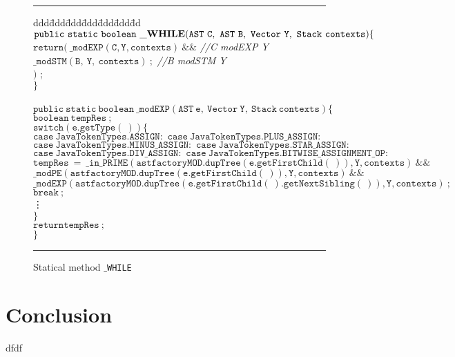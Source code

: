 \documentclass[a4paper]{llncs}
\begin{document}
\begin{figure}[hbt]
\rule{\linewidth}{0.25mm}
\begin{tabbing}
ddd\=ddd\=ddd\=ddd\=ddd\=ddd\=dd \kill
$\mathtt{public\ static\ boolean\ \_{\bf WHILE}(AST\ C,\ AST\ B,\ Vector\ Y,\ Stack\ contexts)\{}$
\\
\>$\mathtt{return(\ \_modEXP(C,Y,contexts)\ \&\&}$ {\it //C modEXP Y} \\
\>\>\>$\mathtt{\_modSTM(B,\ Y,\ contexts)\ ;}$ {\it //B modSTM Y} \\
\>\>$\mathtt{)}$ ; \\
$\mathtt{\}}$ 
\\
\\
$\mathtt{public\ static\ boolean\ \_modEXP(AST\ e,\ Vector\ Y,\ Stack\ contexts)\{}$ \\
\>$\mathtt{boolean\ tempRes\ ;}$ \\
\>$\mathtt{switch(e.getType(\ ))\{}$ \\
\>\>$\mathtt{case\ JavaTokenTypes.ASSIGN:\,\, case\ JavaTokenTypes.PLUS\_ASSIGN:}$  \\
\>\>$\mathtt{case\ JavaTokenTypes.MINUS\_ASSIGN:\,\,case\ JavaTokenTypes.STAR\_ASSIGN:}$ \\
\>\>$\mathtt{case\ JavaTokenTypes.DIV\_ASSIGN:\,\,case\ JavaTokenTypes.BITWISE\_ASSIGNMENT\_OP:}$ \\
\>\>$\mathtt{tempRes\ =\ \_in\_PRIME(astfactoryMOD.dupTree(e.getFirstChild(\ )),Y,contexts)\ \&\&}$  \\ %
\>\>\>$\mathtt{\_modPE(astfactoryMOD.dupTree(e.getFirstChild(\ )),Y,contexts)\ \&\&}$  \\ %
\>\>\>$\mathtt{\_modEXP(astfactoryMOD.dupTree(e.getFirstChild(\ ).getNextSibling(\ )),Y,contexts)\ ;}$ \\%
\>\>$\mathtt{break\ ;}$ \\
\>\>\vdots \\
\>$\mathtt{\}}$ \\
\>$\mathtt{return tempRes\ ;} $ \\
$\mathtt{\}}$
\end{tabbing}
\caption{Statical method \texttt{$\_$WHILE}}
\label{fig-met-sta-whi}
\rule{\linewidth}{0.25mm}
\end{figure}


\section{Conclusion}
\label{sec-con}
dfdf
\end{document}
